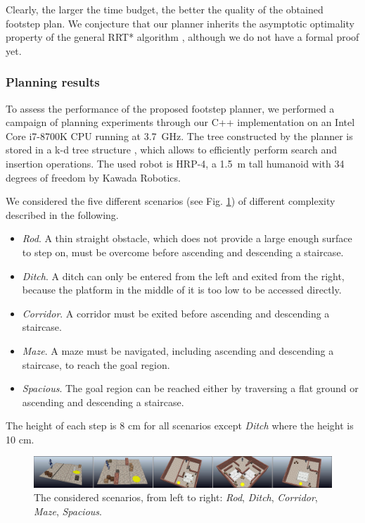 Clearly, the larger the time budget, the better the quality of the obtained
footstep plan. %
We conjecture that our planner inherits the asymptotic optimality property of
the general RRT* algorithm \cite{Karaman2011IJRR}, although we do not have a
formal proof yet.

\subsubsection{Planning results}
\label{sec:WoS:offlineCase:FP:PlanningResults}

To assess the performance of the proposed footstep planner, we performed a
campaign of planning experiments through our C++ implementation on an Intel
Core i7-8700K CPU running at 3.7~GHz.
The tree constructed by the planner is stored in a k-d tree structure
\cite{Yershova2007ImprovingMotionPlanning}, which allows to efficiently perform
search and insertion operations.
The used robot is HRP-4, a 1.5~m tall humanoid with 34 degrees of freedom
by Kawada Robotics.

We considered the five different scenarios (see Fig. \ref{fig:WoS:Scenarios})
of different complexity described in the following.
\begin{itemize}
    \item \textit{Rod}. A thin straight obstacle, which does not provide a large enough surface to step on, must be overcome before ascending and descending a staircase. 
    \item \textit{Ditch}. A ditch can only be entered from the left and exited from the right, because the platform in the middle of it is too low to be accessed directly.
    \item \textit{Corridor}. A corridor must be exited before ascending and descending a staircase. 
    \item \textit{Maze}. A maze must be navigated, including ascending and descending a staircase, to reach the goal region.
    \item \textit{Spacious}. The goal region can be reached either by traversing a flat ground or ascending and descending a staircase.
\end{itemize}

The height of each step is 8 cm for all scenarios except \textit{Ditch} where
the height is 10 cm. 

\begin{figure}
    \centering
    \includegraphics[width=\textwidth]{figures/PlanningScenarios.jpeg}
    \caption{The considered scenarios, from left to right: \textit{Rod}, \textit{Ditch}, \textit{Corridor}, \textit{Maze}, \textit{Spacious}.}
    \label{fig:WoS:Scenarios}
\end{figure}

